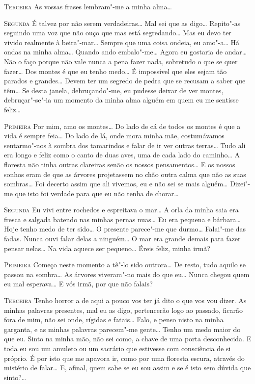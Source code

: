 \textsc{Terceira} As vossas frases lembram"-me a minha alma\ldots{}

\textsc{Segunda} É talvez por não serem verdadeiras\ldots{}
Mal sei que as digo\ldots{}
Repito"-as seguindo uma voz que não ouço que mas está
segredando\ldots{}
Mas eu devo ter vivido realmente à beira"-mar\ldots{}
Sempre que uma coisa
ondeia, eu amo"-a\ldots{} Há ondas na minha alma\ldots{}
Quando ando
embalo"-me\ldots{} Agora eu gostaria de andar\ldots{} 
Não o faço porque não vale
nunca a pena fazer nada, sobretudo o que se quer
fazer\ldots{} Dos montes é
que eu tenho medo\ldots{} É impossível que eles sejam tão parados e
grandes\ldots{} Devem ter um segredo de pedra que se 
recusam a saber que
têm\ldots{} Se desta janela, debruçando"-me,
eu pudesse deixar de ver
montes, debruçar"-se"-ia um momento da minha
alma alguém em quem eu
me sentisse feliz\ldots{}

\textsc{Primeira} Por mim, amo os montes\ldots{}
Do lado de cá de todos os montes é
que a vida é sempre feia\ldots{} Do lado de lá,
onde mora minha mãe,
costumávamos sentarmo"-nos à sombra dos
tamarindos e falar de ir ver
outras terras\ldots{} Tudo ali era longo e
feliz como o canto de duas aves,
uma de cada lado do caminho\ldots{} A floresta
não tinha outras clareiras
senão os nossos pensamentos\ldots{} E os nossos
sonhos eram de que as
árvores projetassem no chão outra calma que
não as suas sombras\ldots{} Foi
decerto assim que ali vivemos, eu e não sei se mais alguém\ldots{}
Dizei"-me que isto foi verdade para que eu não
tenha de chorar\ldots{}

\textsc{Segunda} Eu vivi entre rochedos e espreitava
o mar\ldots{} A orla da minha
saia era fresca e salgada batendo nas minhas pernas
nuas\ldots{} Eu era
pequena e bárbara\ldots{} Hoje tenho medo de 
ter sido\ldots{} 
O presente
parece"-me que durmo\ldots{} 
Falai"-me das fadas. 
Nunca ouvi falar delas a
ninguém\ldots{} O mar era grande demais para fazer
pensar nelas\ldots{} Na vida
aquece ser pequeno\ldots{} Éreis feliz, minha irmã?

\textsc{Primeira} Começo neste momento a tê"-lo
sido outrora\ldots{} De resto, tudo
aquilo se passou na sombra\ldots{} As árvores
viveram"-no mais do que
eu\ldots{} Nunca chegou quem eu mal esperava\ldots{}
E vós irmã, por que não falais? 

\textsc{Terceira} Tenho horror a de aqui a pouco vos
ter já dito o que vos vou
dizer. As minhas palavras presentes, mal eu
as digo, pertencerão logo
ao passado, ficarão fora de mim, não sei onde, 
rígidas e fatais\ldots{}
Falo, e penso nisto na minha garganta, e as minhas palavras
parecem"-me gente\ldots{} Tenho um medo maior 
do que eu. Sinto na minha
mão, não sei como, a chave de uma porta desconhecida.
E toda eu sou um
amuleto ou um sacrário que estivesse com consciência
de si próprio. É
por isto que me apavora ir, como por uma
floresta escura, através do
mistério de falar\ldots{} E, afinal, quem sabe se
eu sou assim e se é isto
sem dúvida que sinto?\ldots{}

